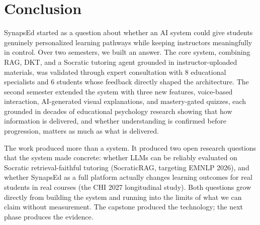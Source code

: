 \documentclass{stylefiles/capstone}
\begin{document}
\section{Conclusion}

SynapsEd started as a question about whether an AI system could give students genuinely personalized learning pathways while keeping instructors meaningfully in control. Over two semesters, we built an answer. The core system, combining RAG, DKT, and a Socratic tutoring agent grounded in instructor-uploaded materials, was validated through expert consultation with 8 educational specialists and 6 students whose feedback directly shaped the architecture. The second semester extended the system with three new features, voice-based interaction, AI-generated visual explanations, and mastery-gated quizzes, each grounded in decades of educational psychology research showing that how information is delivered, and whether understanding is confirmed before progression, matters as much as what is delivered.

The work produced more than a system. It produced two open research questions that the system made concrete: whether LLMs can be reliably evaluated on Socratic retrieval-faithful tutoring (SocraticRAG, targeting EMNLP 2026), and whether SynapsEd as a full platform actually changes learning outcomes for real students in real courses (the CHI 2027 longitudinal study). Both questions grow directly from building the system and running into the limits of what we can claim without measurement. The capstone produced the technology; the next phase produces the evidence.



\end{document}
